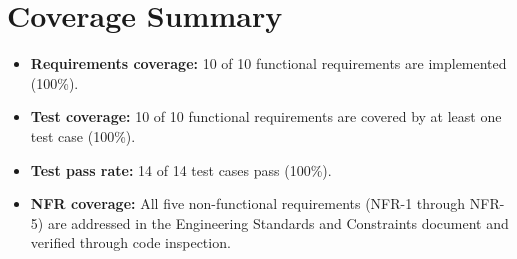 \documentclass[12pt,a4paper]{article}
\begin{document}
\section{Coverage Summary}

\begin{itemize}[leftmargin=2em]
    \item \textbf{Requirements coverage:} 10 of 10 functional requirements
          are implemented (100\%).
    \item \textbf{Test coverage:} 10 of 10 functional requirements are
          covered by at least one test case (100\%).
    \item \textbf{Test pass rate:} 14 of 14 test cases pass (100\%).
    \item \textbf{NFR coverage:} All five non-functional requirements
          (NFR-1 through NFR-5) are addressed in the Engineering Standards
          and Constraints document and verified through code inspection.
\end{itemize}
\end{document}
